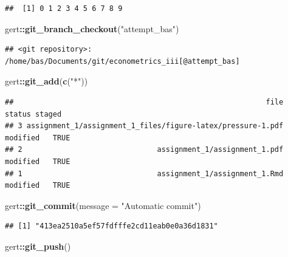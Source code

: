 \documentclass[
]{article}
\newenvironment{Shaded}{\begin{snugshade}}{\end{snugshade}}
\newcommand{\DataTypeTok}[1]{\textcolor[rgb]{0.13,0.29,0.53}{#1}}
\newcommand{\KeywordTok}[1]{\textcolor[rgb]{0.13,0.29,0.53}{\textbf{#1}}}
\newcommand{\NormalTok}[1]{#1}
\newcommand{\OperatorTok}[1]{\textcolor[rgb]{0.81,0.36,0.00}{\textbf{#1}}}
\newcommand{\StringTok}[1]{\textcolor[rgb]{0.31,0.60,0.02}{#1}}
\begin{document}
\begin{verbatim}
##  [1] 0 1 2 3 4 5 6 7 8 9
\end{verbatim}

\begin{Shaded}
\begin{Highlighting}[]
\NormalTok{gert}\OperatorTok{::}\KeywordTok{git_branch_checkout}\NormalTok{(}\StringTok{"attempt_bas"}\NormalTok{)}
\end{Highlighting}
\end{Shaded}

\begin{verbatim}
## <git repository>: /home/bas/Documents/git/econometrics_iii[@attempt_bas]
\end{verbatim}

\begin{Shaded}
\begin{Highlighting}[]
\NormalTok{gert}\OperatorTok{::}\KeywordTok{git_add}\NormalTok{(}\KeywordTok{c}\NormalTok{(}\StringTok{"*"}\NormalTok{))}
\end{Highlighting}
\end{Shaded}

\begin{verbatim}
##                                                          file   status staged
## 3 assignment_1/assignment_1_files/figure-latex/pressure-1.pdf modified   TRUE
## 2                               assignment_1/assignment_1.pdf modified   TRUE
## 1                               assignment_1/assignment_1.Rmd modified   TRUE
\end{verbatim}

\begin{Shaded}
\begin{Highlighting}[]
\NormalTok{gert}\OperatorTok{::}\KeywordTok{git_commit}\NormalTok{(}\DataTypeTok{message =} \StringTok{"Automatic commit"}\NormalTok{)}
\end{Highlighting}
\end{Shaded}

\begin{verbatim}
## [1] "413ea2510a5ef57fdfffe2cd11eab0e0a36d1831"
\end{verbatim}

\begin{Shaded}
\begin{Highlighting}[]
\NormalTok{gert}\OperatorTok{::}\KeywordTok{git_push}\NormalTok{()}
\end{Highlighting}
\end{Shaded}
\end{document}
